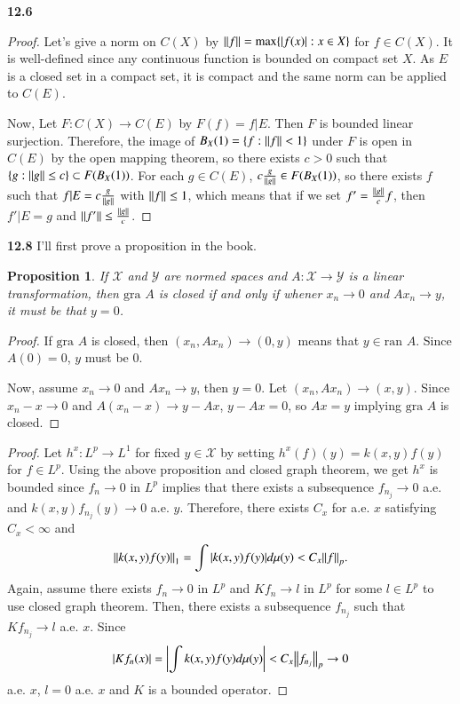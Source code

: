 \documentclass[a4paper, 12pt]{article}
\newcommand{\ran}{\textrm{ran }}
\newcommand{\gra}{\textrm{gra }}
\theoremstyle{Mydefinition}
\theoremstyle{Mytheorem}
\newtheorem{proposition}[statement]{Proposition}
\begin{document}
\noindent \textbf{12.6}
\begin{proof}
Let's give a norm on $C(X)$ by $\norm{f} = \max\{\abs{f(x)}:x\in X\}$ for $f\in C(X)$. It is well-defined since any continuous function is bounded on compact set $X$. As $E$ is a closed set in a compact set, it is compact and the same norm can be applied to $C(E)$. 

Now, Let $F:C(X)\rightarrow C(E)$ by $F(f) = f|E$. Then $F$ is bounded linear surjection. Therefore, the image of $B_X(1) = \{f:\norm{f}< 1\}$ under $F$ is open in $C(E)$ by the open mapping theorem, so there exists $c>0$ such that $\{g:\norm{g}\leq c\}\subset F(B_X(1))$. For each $g\in C(E)$, $c\frac{g}{\norm{g}}\in F(B_X(1))$, so there exists $f$ such that $f|E = c\frac{g}{\norm{g}}$ with $\norm{f} \leq 1$, which means that if we set $f' = \frac{\norm{g}}{c}f$, then $f'|E = g$ and $\norm{f'} \leq \frac{\norm{g}}{c}$.
\end{proof}

\noindent \textbf{12.8}
I'll first prove a proposition in the book.
\begin{proposition}
If $\mathscr{X}$ and $\mathscr{Y}$ are normed spaces and $A:\mathscr{X}\rightarrow\mathscr{Y}$ is a linear transformation, then $\gra A$ is closed if and only if whener $x_n\rightarrow 0$ and $Ax_n\rightarrow y$, it must be that $y=0$.
\end{proposition}
\begin{proof}
If $\gra A$ is closed, then $(x_n, Ax_n)\rightarrow (0, y)$ means that $y\in \ran A$. Since $A(0) = 0$, $y$ must be $0$.

Now, assume $x_n\rightarrow 0$ and $Ax_n\rightarrow y$, then $y=0$. Let $(x_n, Ax_n)\rightarrow (x,y)$. Since $x_n-x\rightarrow 0$ and $A(x_n-x)\rightarrow y-Ax$, $y-Ax = 0$, so $Ax = y$ implying $\gra A$ is closed.
\end{proof}

\begin{proof}
Let $h^x:L^p\rightarrow L^1$ for fixed $y\in \mathscr{X}$ by setting $h^x(f)(y) = k(x,y)f(y)$ for $f\in L^p$. Using the above proposition and closed graph theorem, we get $h^x$ is bounded since $f_n\rightarrow 0$ in $L^p$ implies that there exists a subsequence $f_{n_j}\rightarrow 0$ a.e. and $k(x,y)f_{n_j}(y)\rightarrow 0$ a.e. $y$. Therefore, there exists $C_x$ for a.e. $x$ satisfying $C_x<\infty$ and
\begin{equation}
    \norm{k(x,y)f(y)}_1 = \int \abs{k(x,y)f(y)}d\mu(y) < C_x \norm{f}_p.
\end{equation}
Again, assume there exists $f_n\rightarrow 0$ in $L^p$ and $Kf_n\rightarrow l$ in $L^p$ for some $l\in L^p$ to use closed graph theorem. Then, there exists a subsequence $f_{n_j}$ such that $Kf_{n_j}\rightarrow l$ a.e. $x$. Since
\begin{equation}
    \abs{Kf_n(x)} = \abs{\int k(x,y)f(y)d\mu(y)} < C_x\norm{f_{n_j}}_p\rightarrow 0
\end{equation}
a.e. $x$, $l = 0$ a.e. $x$ and $K$ is a bounded operator.
\end{proof}
\end{document}
